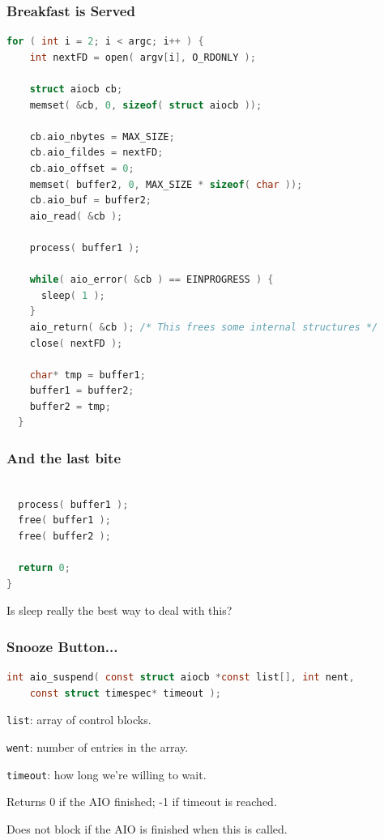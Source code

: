 \begin{frame}[fragile]
\frametitle{Breakfast is Served}

\begin{lstlisting}[language=C]
  for ( int i = 2; i < argc; i++ ) {
    int nextFD = open( argv[i], O_RDONLY );
    
    struct aiocb cb;
    memset( &cb, 0, sizeof( struct aiocb ));
    
    cb.aio_nbytes = MAX_SIZE;
    cb.aio_fildes = nextFD;
    cb.aio_offset = 0;
    memset( buffer2, 0, MAX_SIZE * sizeof( char ));
    cb.aio_buf = buffer2;
    aio_read( &cb );
 
    process( buffer1 );
    
    while( aio_error( &cb ) == EINPROGRESS ) {
      sleep( 1 );
    }
    aio_return( &cb ); /* This frees some internal structures */
    close( nextFD );
    
    char* tmp = buffer1;
    buffer1 = buffer2;
    buffer2 = tmp;
  }
\end{lstlisting}


\end{frame}

\begin{frame}[fragile]
\frametitle{And the last bite}

\begin{lstlisting}[language=C]
  
  process( buffer1 );
  free( buffer1 );
  free( buffer2 );

  return 0;
}
\end{lstlisting}

Is sleep really the best way to deal with this?

\end{frame}


\begin{frame}[fragile]
\frametitle{Snooze Button...}
\begin{lstlisting}[language=C]
int aio_suspend( const struct aiocb *const list[], int nent, 
    const struct timespec* timeout );
\end{lstlisting}

\texttt{list}: array of control blocks.

\texttt{went}: number of entries in the array.

\texttt{timeout}: how long we're willing to wait.

Returns 0 if the AIO finished; -1 if timeout is reached.

Does not block if the AIO is finished when this is called.

\end{frame}


